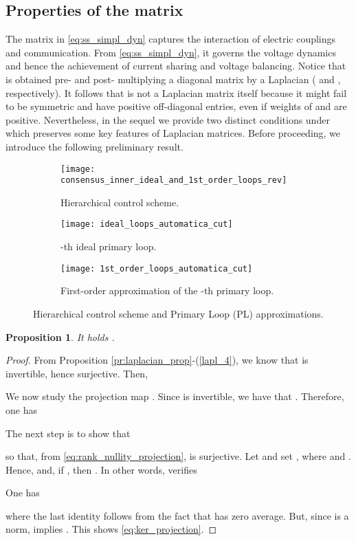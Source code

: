 \documentclass[a4paper]{article}
\theoremstyle{plain}
\newtheorem{prp}{Proposition}
\begin{document}
\subsection{Properties of the matrix }
\label{sec:properties_Q}
The matrix  in \eqref{eq:ss_simpl_dyn} captures the interaction of electric couplings and communication. From \eqref{eq:ss_simpl_dyn}, it governs the voltage dynamics and hence the achievement of current sharing and voltage balancing.
Notice that  is obtained  pre- and post- multiplying a diagonal matrix by a Laplacian ( and , respectively). It follows that  is not a Laplacian matrix itself because it might fail to be symmetric and have
positive off-diagonal entries, even if weights of  and 
are positive. Nevertheless, in the sequel we provide two distinct conditions under which  preserves some key features of Laplacian matrices. Before proceeding, we introduce the following preliminary result.
\begin{figure}[!htb]
	\centering
	\begin{subfigure}[!htb]{0.8\textwidth}
		\centering
		\texttt{[image: consensus\_inner\_ideal\_and\_1st\_order\_loops\_rev]}
		\caption{Hierarchical control scheme.}
		\label{fig:hierarc}
	\end{subfigure}
	\begin{subfigure}[!htb]{0.35\columnwidth}
		\centering
		\texttt{[image: ideal\_loops\_automatica\_cut]}
		\caption{-th ideal primary loop.}
		\label{fig:ith_ideal}
	\end{subfigure}
	\begin{subfigure}[!htb]{0.45\columnwidth}
		\centering
		\texttt{[image: 1st\_order\_loops\_automatica\_cut]}
		\caption{First-order approximation of the -th primary loop.}
		\label{ith_first_order}
	\end{subfigure}
	\caption{Hierarchical control scheme and
		Primary Loop (PL) approximations.}
	\label{fig:hierarc_scheme}
\end{figure}
\begin{prp}
	\label{prp:projection}
	It holds .
\end{prp}
\begin{proof}
	From Proposition \ref{pr:laplacian_prop}-(\ref{lapl_4}), we know that  is invertible, hence surjective. Then,
	
	We now study the projection map . Since  is invertible, we have that . Therefore, one has
	
	The next step is to show that 
	
	so that, from \eqref{eq:rank_nullity_projection},  is surjective. Let  and set , where  and . Hence,  and, if , then . In other words,  verifies
	
	One has
	
	where the last identity follows from the fact that  has zero average. But, since  is a norm,  implies . This shows \eqref{eq:ker_projection}.
\end{proof}
\end{document}
